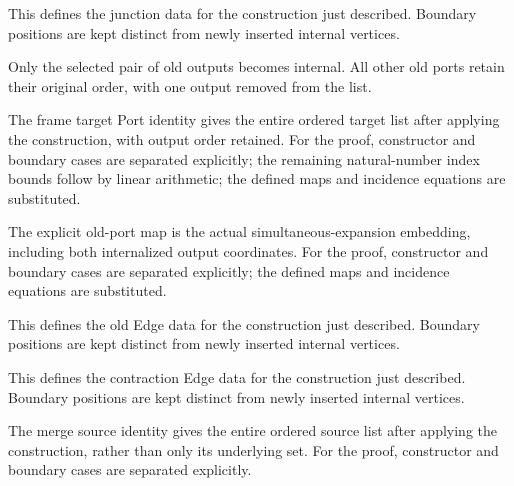 This defines the junction data for the construction just described. Boundary positions are kept distinct from newly inserted internal vertices.
\par{}

Only the selected pair of old outputs becomes internal. All other old ports retain their original order, with one output removed from the list.
\par{}

The frame target Port identity gives the entire ordered target list after applying the construction, with output order retained.
For the proof, constructor and boundary cases are separated explicitly; the remaining natural-number index bounds follow by linear arithmetic; the defined maps and incidence equations are substituted.
\par{}

The explicit old-port map is the actual simultaneous-expansion embedding, including both internalized output coordinates.
For the proof, constructor and boundary cases are separated explicitly; the defined maps and incidence equations are substituted.
\par{}

This defines the old Edge data for the construction just described. Boundary positions are kept distinct from newly inserted internal vertices.
\par{}

This defines the contraction Edge data for the construction just described. Boundary positions are kept distinct from newly inserted internal vertices.
\par{}

The merge source identity gives the entire ordered source list after applying the construction, rather than only its underlying set.
For the proof, constructor and boundary cases are separated explicitly.
\par{}

